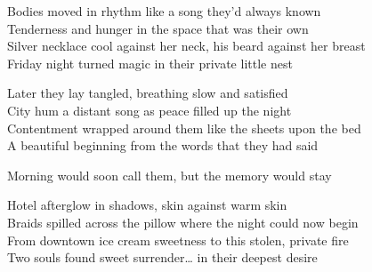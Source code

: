 \begin{lyrics}
Bodies moved in rhythm like a song they’d always known\\
Tenderness and hunger in the space that was their own\\
Silver necklace cool against her neck, his beard against her breast\\
Friday night turned magic in their private little nest

Later they lay tangled, breathing slow and satisfied\\
City hum a distant song as peace filled up the night\\
Contentment wrapped around them like the sheets upon the bed\\
A beautiful beginning from the words that they had said

Morning would soon call them, but the memory would stay

Hotel afterglow in shadows, skin against warm skin\\
Braids spilled across the pillow where the night could now begin\\
From downtown ice cream sweetness to this stolen, private fire\\
Two souls found sweet surrender… in their deepest desire
\end{lyrics}

